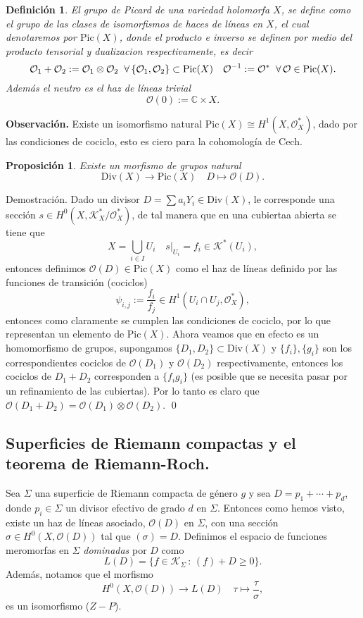 \documentclass[letterpaper]{article}
\newtheorem{prop}[teorema]{Proposici\'on}
\newtheorem{def.}{Definici\'on}[section]
\newcommand{\obs}{{\noindent \sc \textbf{Observación. }}}
\newcommand{\dem}{{\noindent \sc Demostraci\'on. }}
\newcommand{\sig}{\ensuremath{\Sigma}}
\newcommand{\co}{\ensuremath{\mathbb C }}
\newcommand{\lnb}{\ensuremath{\mathcal{O}}}
\newcommand{\Div}{\ensuremath{\mathrm{Div}}}
\begin{document}
\begin{def.}
  El grupo de Picard de una variedad holomorfa \(X\), se define como el grupo de las clases de isomorfismos de haces de líneas en \(X\), el cual denotaremos por \(\mathrm{Pic}(X)\), donde el producto e inverso se definen por medio del producto tensorial y dualizacion respectivamente,  es decir
  \[
    \lnb_{1}+\lnb_{2}:=\lnb_{1}\otimes\lnb_{2}\hspace{0.2cm}\forall\,\{\lnb_{1},\lnb_{2}\}\subset\mathrm{Pic}(X)\quad\lnb^{-1}:=\lnb^{*}\hspace{0.2cm}\forall\,\lnb\in\mathrm{Pic}(X).
  \]
  \noindent Además el neutro es el \emph{haz de líneas trivial}
  \[
    \mathcal{O}(0):=\co\times X.
  \]
\end{def.}
\obs Existe un isomorfismo natural \(\mathrm{Pic}(X)\cong H^{1}(X,\mathcal{O}^{*}_{X})\), dado por las condiciones de cociclo, esto es ciero para la cohomología de Cech.
\begin{prop}
  Existe un morfismo de grupos natural
  \[
    \Div(X)\rightarrow\mathrm{Pic}(X)\quad D\mapsto \lnb(D).
  \]
\end{prop}
\dem Dado un divisor \(D=\sum a_{i}Y_{i}\in\Div(X)\), le corresponde una sección \(s\in H^{0}(X,\mathcal{K}^{*}_{X}/\mathcal{O}^{*}_{X})\), de tal manera que en una cubiertaa abierta se tiene que
\[
  X=\bigcup_{i\in I}U_{i}\quad s|_{U_{i}}=f_{i}\in\mathcal{K}^{*}(U_{i}),
\]
\noindent entonces definimos \(\lnb(D)\in\mathrm{Pic}(X)\) como el haz de líneas definido por las funciones de transición (cociclos)
\[
  \psi_{i,j}:=\frac{f_{i}}{f_{j}}\in H^{1}(U_{i}\cap U_{j},\mathcal{O}^{*}_{X}),
\]
\noindent entonces como claramente se cumplen las condiciones de cociclo, por lo que representan un elemento de \(\mathrm{Pic}(X)\). Ahora veamos que en efecto es un homomorfismo de grupos, supongamos \(\{D_{1},D_{2}\}\subset\Div(X)\) y \(\{f_{i}\},\{g_{i}\}\) son los correspondientes cociclos de \(\lnb(D_{1})\) y \(\lnb(D_{2})\) respectivamente, entonces los cociclos de \(D_{1}+D_{2}\) corresponden a \(\{f_{i}g_{i}\}\) (es posible que se necesita pasar por un refinamiento de las cubiertas). Por lo tanto es claro que \(\lnb(D_{1}+D_{2})=\lnb(D_{1})\otimes\lnb(D_{2})\). \qed
\subsection{Superficies de Riemann compactas y el teorema de Riemann-Roch.}
\noindent Sea \(\sig\) una superficie de Riemann compacta de género \(g\) y sea \(D=p_{1}+\cdots+p_{d}\), donde \(p_{i}\in\sig\) un divisor efectivo de grado \(d\) en \(\sig\). Entonces como hemos visto, existe un haz de líneas asociado, \(\lnb(D)\) en \(\sig\), con una sección \(\sigma\in H^{0}(X,\lnb(D))\) tal que \((\sigma)=D\). Definimos el espacio de funciones meromorfas en \(\sig\) \emph{dominadas} por \(D\) como
\[
  L(D)=\{f\in\mathcal{K}_{\sig}\,:\,(f)+D\geq0\}.
\]
Además, notamos que el morfismo
\[
  H^{0}(X,\lnb(D))\rightarrow L(D)   \quad \tau\mapsto\frac{\tau}{\sigma},
\]
\noindent es un isomorfismo (\(Z-P\)).
\end{document}
